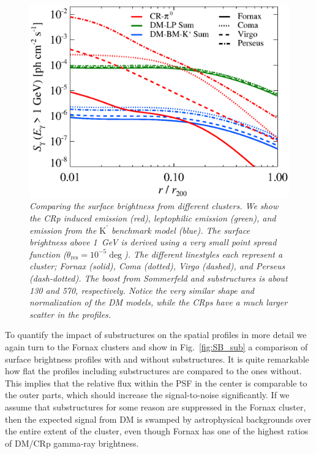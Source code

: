 \documentclass[10pt,aps,pra,reprint,amsmath,amsfonts,amssymb,showpacs]{revtex4-1}
\newcommand{\rmn}{\mathrm}
\newcommand{\psf}{\theta_\rmn{res}}
\newcommand{\Kp}{\rmn{K}^\prime}
\begin{document}
\begin{figure}
 \includegraphics[width=0.99\columnwidth]{figures/SB.v11.1GeV.SF300.SubMass.elmu.eps}
\caption{\it Comparing the surface brightness from different
  clusters. We show the CRp induced emission (red), leptophilic
  emission (green), and emission from the $\Kp$ benchmark model
  (blue). The surface brightness above 1~GeV is derived using a very
  small point spread function ($\psf=10^{-5}\deg$). The
  different linestyles each represent a cluster; Fornax (solid), Coma
  (dotted), Virgo (dashed), and Perseus (dash-dotted). The boost from
  Sommerfeld and substructures is about 130 and 570,
  respectively. Notice the very similar shape and normalization of the DM
  models, while the CRps have a much larger scatter in the profiles.}
 \label{fig:SB_clu}
\end{figure}

To quantify the impact of substructures on the spatial profiles in
more detail we again turn to the Fornax clusters and show in
Fig.~\ref{fig:SB_sub} a comparison of surface brightness profiles with
and without substructures. It is quite remarkable how flat the
profiles including substructures are compared to the ones
without. This implies that the relative flux within the PSF in the
center is comparable to the outer parts, which should increase the
signal-to-noise significantly. If we assume that substructures for
some reason are suppressed in the Fornax cluster, then the expected
signal from DM is swamped by astrophysical backgrounds over the entire
extent of the cluster, even though Fornax has one of the highest
ratios of DM/CRp gamma-ray brightness.
\end{document}
